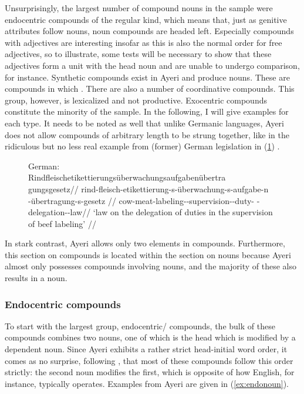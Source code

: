 Unsurprisingly, the largest number of compound nouns in the sample were
endocentric compounds of the regular kind, which means that, just as genitive
attributes follow nouns, noun compounds are headed left. Especially compounds
with adjectives are interesting insofar as this is also the normal order for
free adjectives, so to illustrate, some tests will be necessary to show that
these adjectives form a unit with the head noun and are unable to undergo
comparison, for instance. Synthetic compounds exist in Ayeri and produce nouns.
These are compounds in which . There are also a number of coordinative compounds. This
group, however, is lexicalized and not productive. Exocentric compounds
constitute the minority of the sample. In the following, I will give examples
for each type. It needs to be noted as well that unlike Germanic languages,
Ayeri does not allow compounds of arbitrary length to be strung together, like
in the ridiculous but no less real example from (former) German legislation in
(\ref{ex:REUeAUeG}) \parencite[see, for instance,][]{sz:rindfleisch}.

\begin{figure}[h]
\ex\label{ex:REUeAUeG}%
German:\medskip \\
\begingl%
	\gla %
Rind\-fleisch\-­eti\-ket\-tie\-rungs\-­über\-wa\-chungs\-­auf\-gaben\-über\-tra%
\-gungs\-gesetz//
	\glb rind-fleisch-etikettierung-s-überwachung-s­-aufgabe-n%
		-übertragung-s-gesetz //
	\glc cow-meat-labeling-\Lnk{}-supervision-\Lnk{}-duty-\Lnk{}%
		-delegation-\Lnk{}-law//
	\glft `law on the delegation of duties in the supervision of beef 
		labeling' //
\endgl\xe
\end{figure}

In stark contrast, Ayeri allows only two elements in compounds. Furthermore,
this section on compounds is located within the section on nouns because Ayeri
almost only possesses compounds involving nouns, and the majority of these also
results in a noun.

\subsubsection{Endocentric compounds}
\label{subsubsec:endocomp}

To start with the largest group, endocentric/ compounds, the bulk
of these compounds combines two nouns, one of which is the head which is
modified by a dependent noun. Since Ayeri exhibits a rather strict head-initial
word order, it comes as no surprise, following \citet{gaeta2008}, that most of
these compounds follow this order strictly: the second noun modifies the first,
which is opposite of how English, for instance, typically operates. Examples
from Ayeri are given in (\ref{ex:endonoun}).

